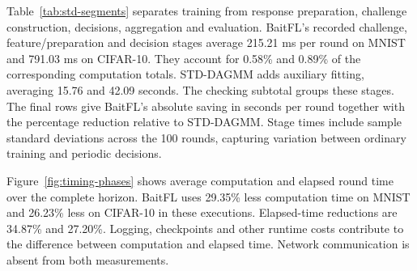 \documentclass[conference]{IEEEtran}
\begin{document}
Table~\ref{tab:std-segments} separates training from response preparation,
challenge construction, decisions, aggregation and evaluation. BaitFL's
recorded challenge, feature/preparation and decision stages average
215.21 ms per round on MNIST and
791.03 ms on CIFAR-10. They account for 0.58\% and
0.89\% of the corresponding computation totals. STD-DAGMM adds auxiliary
fitting, averaging 15.76 and 42.09 seconds.
The checking subtotal groups these stages. The final rows give BaitFL's
absolute saving in seconds per round together with the percentage
reduction relative to STD-DAGMM. Stage times include sample standard
deviations across the 100 rounds, capturing variation between ordinary
training and periodic decisions.

Figure~\ref{fig:timing-phases} shows average
computation and elapsed round time over the complete horizon. BaitFL uses
29.35\% less computation time on MNIST and
26.23\% less on CIFAR-10 in these executions. Elapsed-time
reductions are 34.87\% and
27.20\%. Logging, checkpoints and other runtime costs
contribute to the difference between computation and elapsed time. Network
communication is absent from both measurements.
\end{document}
